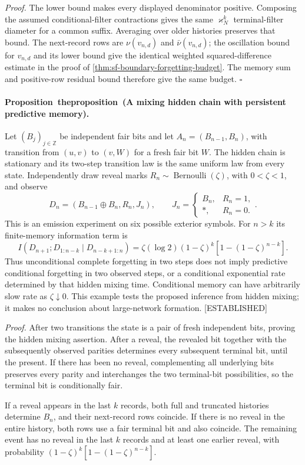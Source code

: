 \documentclass[11pt,letterpaper]{report}
\newcounter{statementsequence}[chapter]
\newcommand{\syncstatementcounter}[1]{\stepcounter{statementsequence}\setcounter{#1}{\numexpr\value{statementsequence}-1\relax}\refstepcounter{#1}}
\newcommand{\resultheading}[4]{\syncstatementcounter{#2}\label{#4}\paragraph{#1~\csname the#2\endcsname\ (#3).}}
\newcommand{\propositionheading}[2]{\resultheading{Proposition}{proposition}{#1}{#2}}
\newcommand{\status}[1]{\mbox{{\small\textsc{\textcolor{red!45!black}{[#1]}}}}}
\begin{document}
\noindent\emph{Proof.}
The lower bound makes every displayed denominator positive. Composing the assumed conditional-filter contractions gives the same $\varkappa_N^k$ terminal-filter diameter for a common suffix. Averaging over older histories preserves that bound. The next-record rows are $\nu(v_{n,d})$ and $\bar\nu(v_{n,d})$; the oscillation bound for $v_{n,d}$ and its lower bound give the identical weighted squared-difference estimate in the proof of \cref{thm:sf-boundary-forgetting-budget}. The memory sum and positive-row residual bound therefore give the same budget. $\square$


\propositionheading{A mixing hidden chain with persistent predictive memory}{prop:sf-boundary-mixing-failure}
Let $(B_j)_{j\in\mathbb Z}$ be independent fair bits and let $A_n=(B_{n-1},B_n)$, with transition from $(u,v)$ to $(v,W)$ for a fresh fair bit $W$. The hidden chain is stationary and its two-step transition law is the same uniform law from every state. Independently draw reveal marks $R_n\sim\operatorname{Bernoulli}(\zeta)$, with $0<\zeta<1$, and observe
\[
 D_n=(B_{n-1}\mathbin\oplus B_n,R_n,J_n),
 \qquad
 J_n=\begin{cases}B_n,&R_n=1,\\ *,&R_n=0.\end{cases}.
\]
This is an emission experiment on six possible exterior symbols. For $n>k$ its finite-memory information term is
\[
 I(D_{n+1};D_{1:n-k}\mid D_{n-k+1:n})
 =\zeta(\log 2)(1-\zeta)^k
                    [1-(1-\zeta)^{n-k}].
 \label{eq:sf-boundary-reveal-memory}
\]
Thus unconditional complete forgetting in two steps does not imply predictive conditional forgetting in two observed steps, or a conditional exponential rate determined by that hidden mixing time. Conditional memory can have arbitrarily slow rate as $\zeta\downarrow0$. This example tests the proposed inference from hidden mixing; it makes no conclusion about large-network formation. \status{ESTABLISHED}

\noindent\emph{Proof.}
After two transitions the state is a pair of fresh independent bits, proving the hidden mixing assertion. After a reveal, the revealed bit together with the subsequently observed parities determines every subsequent terminal bit, until the present. If there has been no reveal, complementing all underlying bits preserves every parity and interchanges the two terminal-bit possibilities, so the terminal bit is conditionally fair.

If a reveal appears in the last $k$ records, both full and truncated histories determine $B_n$, and their next-record rows coincide. If there is no reveal in the entire history, both rows use a fair terminal bit and also coincide. The remaining event has no reveal in the last $k$ records and at least one earlier reveal, with probability $(1-\zeta)^k[1-(1-\zeta)^{n-k}]$.
\end{document}
